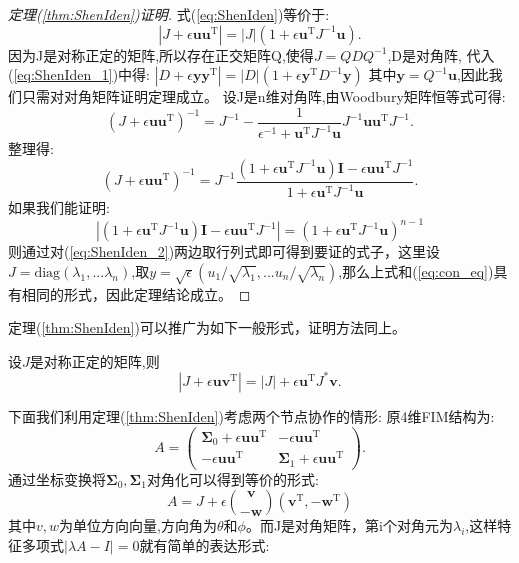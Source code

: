 \begin{proof}[定理(\ref{thm:ShenIden})证明]
式(\ref{eq:ShenIden})等价于:
\begin{equation}\label{eq:ShenIden_1}
|J+\epsilon \bm{u}\bm{u}^{\textrm{T}} |=|J|(1+\epsilon \bm{u}^{\textrm{T}} J^{-1}\bm{u}).
\end{equation}
因为J是对称正定的矩阵,所以存在正交矩阵Q,使得$J=QDQ^{-1}$,D是对角阵,
代入(\ref{eq:ShenIden_1})中得:
$|D+\epsilon \bm{y}\bm{y}^{\textrm{T}} |=|D|(1+\epsilon \bm{y}^{\textrm{T}} D^{-1}\bm{y})$
其中$\bm{y}=Q^{-1}\bm{u}$,因此我们只需对对角矩阵证明定理成立。
设J是n维对角阵,由Woodbury矩阵恒等式可得:
\begin{equation}
(J+\epsilon \bm{u}\bm{u}^{\textrm{T}} )^{-1}=J^{-1}-\frac{1}{\epsilon^{-1}+\bm{u}^{\textrm{T}} J^{-1}\bm{u}}J^{-1}\bm{u}\bm{u}^{\textrm{T}} J^{-1}.
\end{equation}
整理得:
\begin{equation}\label{eq:ShenIden_2}
(J+\epsilon \bm{u}\bm{u}^{\textrm{T}} )^{-1}=J^{-1}\frac{(1+\epsilon\bm{u}^{\textrm{T}} J^{-1}\bm{u})\bm{I}-\epsilon \bm{u}\bm{u}^{\textrm{T}} J^{-1}}{1+\epsilon\bm{u}^{\textrm{T}} J^{-1}\bm{u}}.
\end{equation}
如果我们能证明:
\begin{equation}
|(1+\epsilon\bm{u}^{\textrm{T}} J^{-1}\bm{u})\bm{I}-\epsilon \bm{u}\bm{u}^{\textrm{T}} J^{-1}|=(1+\epsilon\bm{u}^{\textrm{T}} J^{-1}\bm{u})^{n-1}
\end{equation}
则通过对(\ref{eq:ShenIden_2})两边取行列式即可得到要证的式子，这里设$J=\text{diag}(\lambda_1,...\lambda_n)$,取$y=\sqrt{\epsilon}(u_1/\sqrt{\lambda_1},...u_n/\sqrt{\lambda_n})$,那么上式和(\ref{eq:con_eq})具有相同的形式，因此定理结论成立。
\end{proof}
定理(\ref{thm:ShenIden})可以推广为如下一般形式，证明方法同上。
\begin{corollary}设$J$是对称正定的矩阵,则
\begin{equation}
|J+\epsilon \bm{u}\bm{v}^{\textrm{T}} |=|J|+\epsilon \bm{u}^{\textrm{T}} J^*\bm{v}.
\end{equation}
\end{corollary}
下面我们利用定理(\ref{thm:ShenIden})考虑两个节点协作的情形:
原4维FIM结构为:
\begin{equation}
A=\left(\begin{array}{cc}
\bm{\Sigma}_0+\epsilon \bm{u}\bm{u}^{\textrm{T}}  &-\epsilon \bm{u}\bm{u}^{\textrm{T}}  \\
-\epsilon \bm{u}\bm{u}^{\textrm{T}}  & \bm{\Sigma}_1+\epsilon \bm{u}\bm{u}^{\textrm{T}}
\end{array}
\right).
\end{equation}
通过坐标变换将$\bm{\Sigma}_0,\bm{\Sigma}_1$对角化可以得到等价的形式:
\begin{equation}
A=J+\epsilon\binom{\bm{v}}{-\bm{w}}(\bm{v}^{\textrm{T}} ,-\bm{w}^{\textrm{T}} )
\end{equation}
其中$v,w$为单位方向向量,方向角为$\theta$和$\phi$。而J是对角矩阵，第i个对角元为$\lambda_i$,这样特征多项式$|\lambda A-I|=0$就有简单的表达形式:


